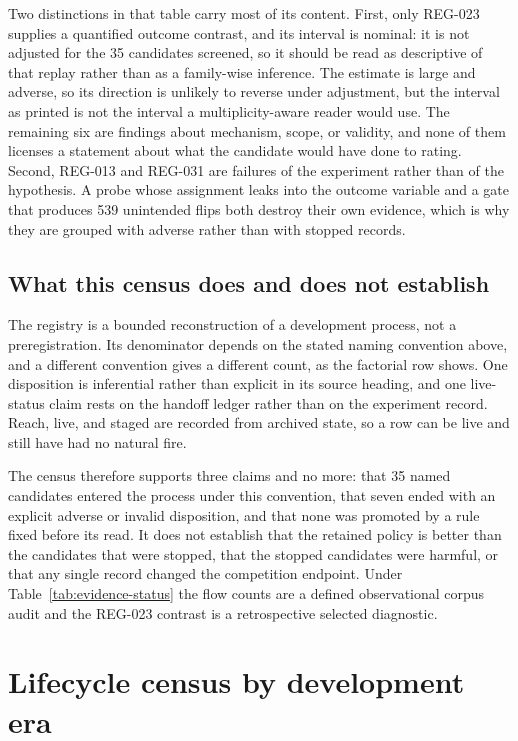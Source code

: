 Two distinctions in that table carry most of its content. First, only REG-023
supplies a quantified outcome contrast, and its interval is nominal: it is not
adjusted for the 35 candidates screened, so it should be read as descriptive of
that replay rather than as a family-wise inference. The estimate is large and
adverse, so its direction is unlikely to reverse under adjustment, but the
interval as printed is not the interval a multiplicity-aware reader would
use. The remaining six are findings about
mechanism, scope, or validity, and none of them licenses a statement about what
the candidate would have done to rating. Second, REG-013 and REG-031 are
failures of the experiment rather than of the hypothesis. A probe whose
assignment leaks into the outcome variable and a gate that produces 539
unintended flips both destroy their own evidence, which is why they are grouped
with adverse rather than with stopped records.

\subsection{What this census does and does not establish}

The registry is a bounded reconstruction of a development process, not a
preregistration. Its denominator depends on the stated naming convention above,
and a different convention gives a different count, as the factorial row shows.
One disposition is inferential rather than explicit in its source heading, and
one live-status claim rests on the handoff ledger rather than on the experiment
record. Reach, live, and staged are recorded from archived state, so a row can
be live and still have had no natural fire.

The census therefore supports three claims and no more: that 35 named
candidates entered the process under this convention, that seven ended with an
explicit adverse or invalid disposition, and that none was promoted by a rule
fixed before its read. It does not establish that the retained policy is better
than the candidates that were stopped, that the stopped candidates were
harmful, or that any single record changed the competition endpoint. Under
Table~\ref{tab:evidence-status} the flow counts are a defined observational
corpus audit and the REG-023 contrast is a retrospective selected diagnostic.

\section{Lifecycle census by development era}
\label{app:lifecycle}

